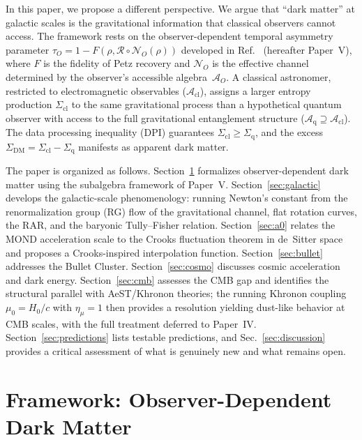\documentclass[prd,twocolumn,superscriptaddress,longbibliography,floatfix]{revtex4-2}
\newcommand{\Petz}{\mathcal{R}}
\newcommand{\chan}{\mathcal{N}}
\newcommand{\tauasym}{\tau}
\newcommand{\algO}{\mathcal{A}}
\begin{document}
In this paper, we propose a different perspective.  We argue
that ``dark matter'' at galactic scales is the gravitational
information that classical observers cannot access.  The
framework rests on the observer-dependent temporal asymmetry
parameter $\tauasym_O = 1 - F(\rho, \Petz \circ \chan_O(\rho))$
developed in Ref.~\cite{Paper5} (hereafter Paper~V), where $F$
is the fidelity of Petz recovery and $\chan_O$ is the effective
channel determined by the observer's accessible
algebra~$\algO_O$.  A classical astronomer, restricted to
electromagnetic observables ($\algO_{\mathrm{cl}}$), assigns a
larger entropy production $\Sigma_{\mathrm{cl}}$ to the same
gravitational process than a hypothetical quantum observer with
access to the full gravitational entanglement structure
($\algO_{\mathrm{q}} \supseteq \algO_{\mathrm{cl}}$).  The
data processing inequality (DPI) guarantees
$\Sigma_{\mathrm{cl}} \geq \Sigma_{\mathrm{q}}$, and the
excess $\Sigma_{\mathrm{DM}} = \Sigma_{\mathrm{cl}} -
\Sigma_{\mathrm{q}}$ manifests as apparent dark matter.

The paper is organized as follows.
Section~\ref{sec:framework} formalizes observer-dependent dark
matter using the subalgebra framework of Paper~V.
Section~\ref{sec:galactic} develops the galactic-scale
phenomenology: running Newton's constant from the
renormalization group (RG) flow of the gravitational channel,
flat rotation curves, the RAR, and the baryonic Tully--Fisher
relation.
Section~\ref{sec:a0} relates the MOND acceleration scale
to the Crooks fluctuation theorem in de~Sitter space and
proposes a Crooks-inspired interpolation function.
Section~\ref{sec:bullet} addresses the Bullet Cluster.
Section~\ref{sec:cosmo} discusses cosmic acceleration and
dark energy.
Section~\ref{sec:cmb} assesses the CMB gap and
identifies the structural parallel with AeST/Khronon theories;
the running Khronon coupling $\mu_0 = H_0/c$ with
$\eta_\mu = 1$ then provides a resolution yielding dust-like
behavior at CMB scales, with the full treatment deferred to
Paper~IV.
Section~\ref{sec:predictions} lists testable predictions,
and Sec.~\ref{sec:discussion} provides a critical assessment
of what is genuinely new and what remains open.

\section{Framework: Observer-Dependent Dark Matter}
\label{sec:framework}
\end{document}
